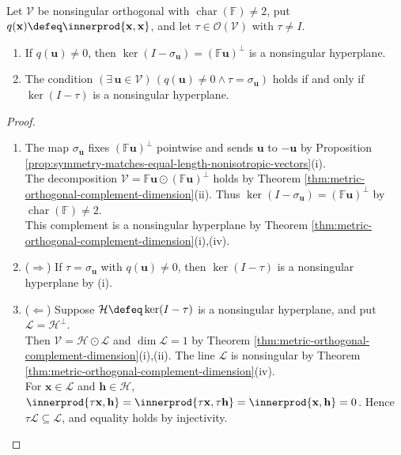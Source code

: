 \begin{proposition} \label{prop:symmetries-fixed-hyperplanes} \\
Let $\mathcal{V}$ be nonsingular orthogonal with $\operatorname{char}(\mathbb{F})\neq2$, put $q(\mathbf{x})\defeq\innerprod{\mathbf{x},\mathbf{x}}$, and let $\tau\in\mathcal{O}(\mathcal{V})$ with $\tau\neq I$.
\begin{enumerate}[label=(\roman*)]
\setlength{\itemsep}{0pt}
\item If $q(\mathbf{u})\neq0$, then $\ker(I-\sigma_{\mathbf{u}})=(\mathbb{F}\mathbf{u})^{\perp}$ is a nonsingular hyperplane.
\item The condition $(\exists\,\mathbf{u}\in\mathcal{V})\,(q(\mathbf{u})\neq0\wedge\tau=\sigma_{\mathbf{u}})$ holds if and only if $\ker(I-\tau)$ is a nonsingular hyperplane.
\end{enumerate}
\begin{proof}
\begin{enumerate}[label=(\roman*)]
\setlength{\itemsep}{0pt}
\item[$(i)$] The map $\sigma_{\mathbf{u}}$ fixes $(\mathbb{F}\mathbf{u})^{\perp}$ pointwise and sends $\mathbf{u}$ to $-\mathbf{u}$ by Proposition \ref{prop:symmetry-matches-equal-length-nonisotropic-vectors}(i).\\
The decomposition $\mathcal{V}=\mathbb{F}\mathbf{u}\odot(\mathbb{F}\mathbf{u})^{\perp}$ holds by Theorem \ref{thm:metric-orthogonal-complement-dimension}(ii). Thus $\ker(I-\sigma_{\mathbf{u}})=(\mathbb{F}\mathbf{u})^{\perp}$ by $\operatorname{char}(\mathbb{F})\neq2$.\\
This complement is a nonsingular hyperplane by Theorem \ref{thm:metric-orthogonal-complement-dimension}(i),(iv).
\item[$(ii)$] ($\Rightarrow$) If $\tau=\sigma_{\mathbf{u}}$ with $q(\mathbf{u})\neq0$, then $\ker(I-\tau)$ is a nonsingular hyperplane by (i).
\item[$(ii)$] ($\Leftarrow$) Suppose $\mathcal{H}\defeq\ker(I-\tau)$ is a nonsingular hyperplane, and put $\mathcal{L}=\mathcal{H}^{\perp}$.\\
Then $\mathcal{V}=\mathcal{H}\odot\mathcal{L}$ and $\dim\mathcal{L}=1$ by Theorem \ref{thm:metric-orthogonal-complement-dimension}(i),(ii). The line $\mathcal{L}$ is nonsingular by Theorem \ref{thm:metric-orthogonal-complement-dimension}(iv).\\
For $\mathbf{x}\in\mathcal{L}$ and $\mathbf{h}\in\mathcal{H}$, $\innerprod{\tau\mathbf{x},\mathbf{h}}=\innerprod{\tau\mathbf{x},\tau\mathbf{h}}=\innerprod{\mathbf{x},\mathbf{h}}=0$. Hence $\tau\mathcal{L}\subseteq\mathcal{L}$, and equality holds by injectivity.\\

\end{enumerate}
\end{proof}
\end{proposition}
